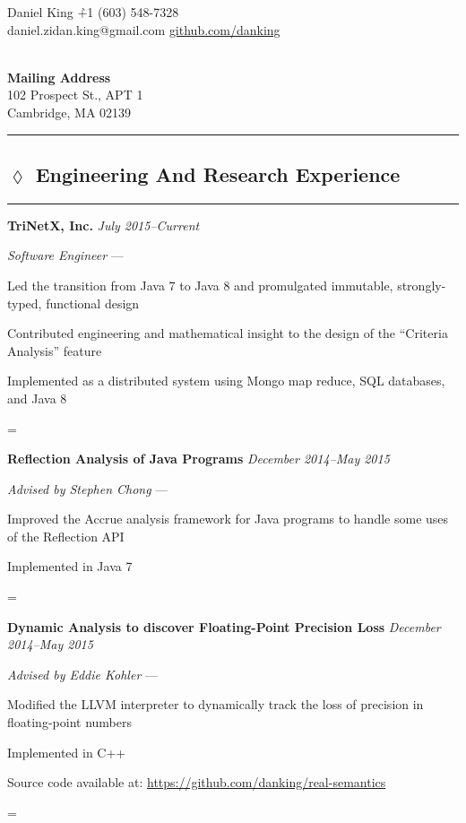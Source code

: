 \documentclass[10pt]{article}
\newenvironment{absolutelynopagebreak}
  {\par\nobreak\vfil\penalty0\vfilneg
   \vtop\bgroup}
  {\par\xdef\tpd{\the\prevdepth}\egroup
   \prevdepth=\tpd}
\newenvironment{my-itemize}
  {\begin{itemize*}
   \renewcommand{\labelitemi}{$\angle$}
  }
  {\end{itemize*}}
\newcommand{\job}[6]{
  \begin{absolutelynopagebreak}
  \vspace{-5pt}
  \begin{tabbing} {\bf #1} \` {\small \textit{#3}} \end{tabbing}
  \vspace{-12pt}
  \begin{my-itemize}
  \setlength\itemsep{1pt}
  \item [] {\textit{#4} \ifthenelse{\equal{#5}{}}
                                   {}
                                   {--- #5}}
  #6
  \end{my-itemize}%
  \end{absolutelynopagebreak}
  \vspace{-18pt}
}
\newcommand{\heading}[2]{
  \vspace{1.5em}
  \subsection*{\hspace{-.9em}$\lozenge$ #1}
  \vspace{-12pt}
  \rule{2in}{.5pt}
  \vspace{-1em}
  #2
}
\begin{document}
\begin{tabbing}{\Huge Daniel King} \`+1 (603) 548-7328\\
\normalsize daniel.zidan.king@gmail.com \`\url{github.com/danking}
\end{tabbing}

\vspace{-15pt}

\begin{tabbing}
                                        \`\\
\textbf{Mailing Address}                \`\\
102 Prospect St., APT 1                 \`\\
Cambridge, MA 02139                     \`\\
\end{tabbing}
\vspace{-25pt}
\rule{\linewidth}{.1pt}

\vspace{-2em}
\heading{Engineering And Research Experience}

\job{TriNetX, Inc.}
    {Cambridge, MA}
    {July 2015--Current}
    {Software Engineer}
    {}{
    \item{Led the transition from Java 7 to Java 8 and promulgated immutable,
      strongly-typed, functional design}
    \item{Contributed engineering and mathematical insight to the design of the
      ``Criteria Analysis'' feature}
    \item{Implemented as a distributed system using Mongo map reduce, SQL
      databases, and Java 8}

}

\job{Reflection Analysis of Java Programs}
    {}
    {December 2014--May 2015}
    {Advised by Stephen Chong}
    {}{
  \item{Improved the Accrue analysis framework for Java programs to handle
      some uses of the Reflection API}
  \item{Implemented in Java 7}
}

\job{Dynamic Analysis to discover Floating-Point Precision Loss}
    {}
    {December 2014--May 2015}
    {Advised by Eddie Kohler}
    {}{
  \item{Modified the LLVM interpreter to dynamically track the loss of precision
    in floating-point numbers}
  \item{Implemented in C++}
  \item{Source code available at: \url{https://github.com/danking/real-semantics}}
}
\end{document}
